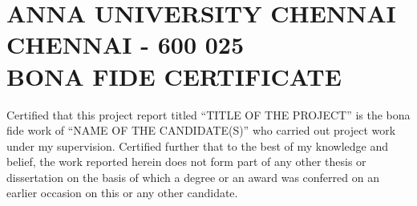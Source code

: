 \documentclass[13 pt,a4paper,twoside]{aureportm}%
\begin{document}
\chapter*{ANNA UNIVERSITY CHENNAI\\
CHENNAI - 600 025\\
BONA FIDE CERTIFICATE}
\newlength{\aulength}
\settowidth{\aulength}{Anna University
  Chennai}
\newlength{\datewidth}
\settowidth{\datewidth}{Chennai 600 025}

\begin{spacing}{1.5}
  \begin{sloppypar}
  \fontsize{14}{17}\selectfont Certified that this project report titled ``TITLE OF THE PROJECT'' is the bona fide work of ``NAME OF THE CANDIDATE(S)'' who carried out project work under my supervision. Certified further that to the best of my knowledge and belief, the work reported herein does not form part of any other thesis or dissertation on the basis of which a degree or an award was conferred on an earlier occasion on this or any other candidate.
  \end{sloppypar}
\end{spacing}

\end{document}
